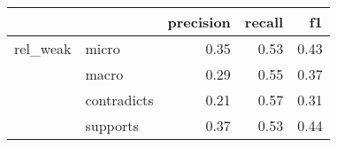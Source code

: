\begin{tabular}{llrrr}
\toprule
         &          &  precision &  recall &   f1 \\
\midrule
rel\_weak & micro &       0.35 &    0.53 & 0.43 \\
         & macro &       0.29 &    0.55 & 0.37 \\
         & contradicts &       0.21 &    0.57 & 0.31 \\
         & supports &       0.37 &    0.53 & 0.44 \\
\bottomrule
\end{tabular}
